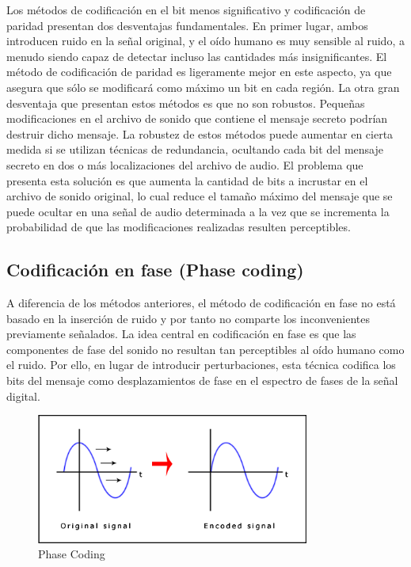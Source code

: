\documentclass[12pt]{article}
\begin{document}
\bigskip

Los métodos de codificación en el bit menos significativo y codificación de paridad presentan dos desventajas fundamentales. En primer lugar, ambos introducen ruido en la señal original, y el oído humano es muy sensible al ruido, a menudo siendo capaz de detectar incluso las cantidades más insignificantes. El método de codificación de paridad es ligeramente mejor en este aspecto, ya que asegura que sólo se modificará como máximo un bit en cada región. La otra gran desventaja que presentan estos métodos es que no son robustos. Pequeñas modificaciones en el archivo de sonido que contiene el mensaje secreto podrían destruir dicho mensaje. La robustez de estos métodos puede aumentar en cierta medida si se utilizan técnicas de redundancia, ocultando cada bit del mensaje secreto en dos o más localizaciones del archivo de audio. El problema que presenta esta solución es que aumenta la cantidad de bits a incrustar en el archivo de sonido original, lo cual reduce el tamaño máximo del mensaje que se puede ocultar en una señal de audio determinada a la vez que se incrementa la probabilidad de que las modificaciones realizadas resulten perceptibles.

\subsection{Codificación en fase (Phase coding)}

A diferencia de los métodos anteriores, el método de codificación en fase no está basado en la inserción de ruido y por tanto no comparte los inconvenientes previamente señalados. La idea central en codificación en fase es que las componentes de fase del sonido no resultan tan perceptibles al oído humano como el ruido. Por ello, en lugar de introducir perturbaciones, esta técnica codifica los bits del mensaje como desplazamientos de fase en el espectro de fases de la señal digital.

\begin{figure}
  \centering
    \includegraphics[width=0.8\textwidth]{img/phaseshift}
  \caption{Phase Coding}
  \label{phasecoding}
\end{figure}
\end{document}
